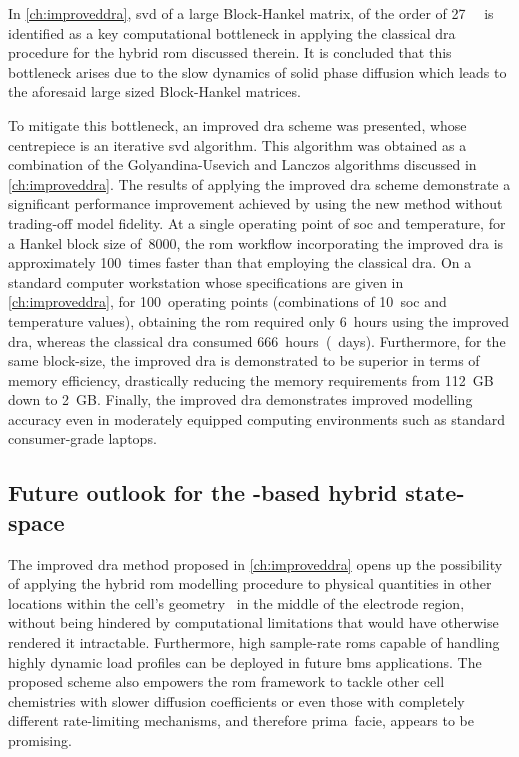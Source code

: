 In \cref{ch:improveddra}, \gls{svd} of a large Block-Hankel matrix, of the order
of \SI{27}{\giga\byte} is identified as a key computational bottleneck  in
applying the classical \gls{dra} procedure for the hybrid \gls{rom} discussed
therein. It is concluded that this bottleneck arises due  to the  slow dynamics
of  solid phase diffusion  which leads  to the aforesaid large sized
Block-Hankel matrices.

To mitigate this  bottleneck, an improved \gls{dra} scheme  was presented, whose
centrepiece is an iterative \gls{svd}  algorithm. This algorithm was obtained as
a  combination of  the Golyandina-Usevich  and Lanczos  algorithms discussed  in
\cref{ch:improveddra}.  The results  of applying  the improved  \gls{dra} scheme
demonstrate  a significant  performance improvement  achieved by  using the  new
method  without trading-off  model  fidelity.  At a  single  operating point  of
\gls{soc}  and temperature,  for  a  Hankel block  size  of~8000, the  \gls{rom}
workflow incorporating the improved  \gls{dra} is approximately 100~times faster
than that employing the classical  \gls{dra}. On a standard computer workstation
whose  specifications  are  given in  \cref{ch:improveddra},  for  100~operating
points  (combinations of  10~\gls{soc}  and temperature  values), obtaining  the
\gls{rom}  required  only 6~hours  using  the  improved \gls{dra},  whereas  the
classical \gls{dra}  consumed 666~hours~(~days). Furthermore,  for the
same block-size, the improved \gls{dra} is  demonstrated to be superior in terms
of memory efficiency,  drastically reducing the memory  requirements from 112~GB
down to  2~GB. Finally, the  improved \gls{dra} demonstrates  improved modelling
accuracy even  in moderately  equipped computing  environments such  as standard
consumer-grade laptops.

\subsection{Future outlook for the -based hybrid state-space }

The improved  \gls{dra} method  proposed in  \cref{ch:improveddra} opens  up the
possibility of  applying the  hybrid \gls{rom}  modelling procedure  to physical
quantities in  other locations within the  cell's geometry \eg~in the  middle of
the electrode region,  without being hindered by  computational limitations that
would  have otherwise  rendered  it intractable.  Furthermore, high  sample-rate
\glspl{rom} capable of handling highly dynamic  load profiles can be deployed in
future \gls{bms} applications.  The proposed scheme also  empowers the \gls{rom}
framework to tackle other cell chemistries with slower diffusion coefficients or
even  those with  completely different  rate-limiting mechanisms,  and therefore
prima~facie, appears to be promising.

